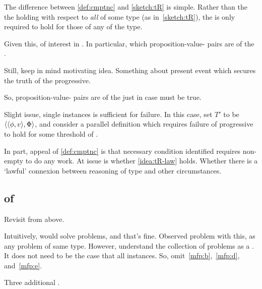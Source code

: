 \begin{note}
  The difference between \autoref{def:cmptnc} and \autoref{sketch:tR} is simple.
  Rather than the the \itc{} holding with respect to \emph{all} \tI{} of some type (as in~\autoref{sketch:tR}), the \itc{} is only required to hold for those  of any \emph{} of the type.

  Given this, of interest in .
  In particular, which proposition-value-\pool{} pairs are  of the .

  Still, keep in mind motivating idea.
  Something about present event which secures the truth of the progressive.

  So, proposition-value-\pool{} pairs are  of the  just in case \itc{} must be true.
\end{note}

\begin{note}
  Slight issue, single instances is sufficient for failure.
  In this case, set \(T'\) to be \(\langle \langle \phi, v \rangle, \Phi \rangle\), and consider a parallel definition which requires failure of progressive to hold for some threshold of \tI{}.

  In part, appeal of \autoref{def:cmptnc} is that necessary condition identified requires non-empty \tRep{} to do any work.
  At issue is whether \autoref{idea:tR-law} holds.
  Whether there is a `lawful' connexion between reasoning of type and other circumstances.
\end{note}

\subsection{ of \tR{}}
\label{sec:illu3}

\begin{note}
  Revisit  from above.

  Intuitively, would solve problems, and that's fine.
  Observed problem with this, as any problem of same type.
  However, understand the collection of problems as a .
  It does not need to be the case that all instances.
  So, omit~\ref{mfp:b},~\ref{mfp:d}, and~\ref{mfp:e}.
\end{note}

\begin{note}
  Three additional .
\end{note}

